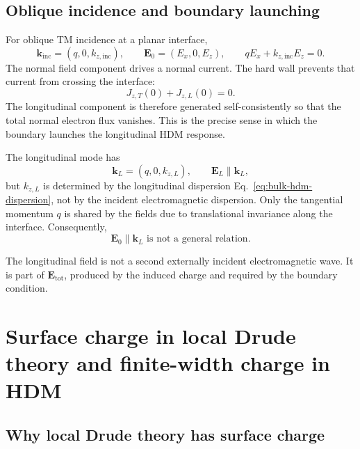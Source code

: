 \documentclass[11pt,a4paper]{article}
\newcommand{\E}{\mathbf E}
\begin{document}
\subsection{Oblique incidence and boundary launching}

For oblique TM incidence at a planar interface,
\begin{equation}
    \mathbf k_{\mathrm{inc}}=(q,0,k_{z,\mathrm{inc}}),
    \qquad
    \E_0=(E_x,0,E_z),
    \qquad
    qE_x+k_{z,\mathrm{inc}}E_z=0.
    \label{eq:TM-incident}
\end{equation}
The normal field component drives a normal current.  The hard wall prevents
that current from crossing the interface:
\begin{equation}
    J_{z,T}(0)+J_{z,L}(0)=0.
    \label{eq:current-cancellation-wall}
\end{equation}
The longitudinal component is therefore generated self-consistently so that
the total normal electron flux vanishes.  This is the precise sense in which
the boundary launches the longitudinal HDM response.

The longitudinal mode has
\begin{equation}
    \mathbf k_L=(q,0,k_{z,L}),
    \qquad
    \E_L\parallel\mathbf k_L,
    \label{eq:planar-longitudinal-wavevector}
\end{equation}
but \(k_{z,L}\) is determined by the longitudinal dispersion
Eq.~\eqref{eq:bulk-hdm-dispersion}, not by the incident electromagnetic
dispersion.  Only the tangential momentum \(q\) is shared by the fields due to
translational invariance along the interface.  Consequently,
\begin{equation}
    \boxed{\E_0\parallel\mathbf k_L\text{ is not a general relation}.}
    \label{eq:no-general-parallel}
\end{equation}

The longitudinal field is not a second externally incident electromagnetic
wave.  It is part of \(\E_{\mathrm{tot}}\), produced by the induced charge and
required by the boundary condition.

\section{Surface charge in local Drude theory and finite-width charge in HDM}

\subsection{Why local Drude theory has surface charge}
\end{document}
